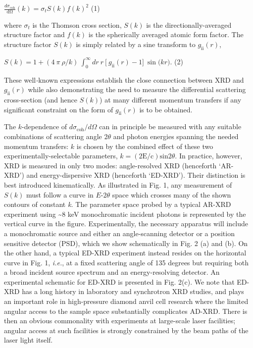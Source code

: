 \(\frac{d\sigma_{\text{coh}}}{\text{dΩ}}\left( k \right) = \sigma_{t}S\left( k \right){f\left( k \right)}^{2}\)
(1)

where \(\sigma_{t}\) is the Thomson cross section, \(S(k)\) is the
directionally-averaged structure factor and \(f\left( k \right)\) is the
spherically averaged atomic form factor. The structure factor \(S(k)\)
is simply related by a sine transform to
\(g_{\text{ii}}\left( r \right)\),

\(S\left( k \right) = 1 + (4\ \pi\ \rho/k)\ \int_{0}^{\infty}{dr\ r\ \lbrack\ g_{\text{ii}}\left( r \right) - 1\rbrack}\ \sin{(kr})\).
(2)

These well\emph{-}known expressions establish the close connection
between XRD and \(g_{\text{ii}}\left( r \right)\) while also
demonstrating the need to measure the differential scattering
cross-section (and hence \(S(k)\)) at many different momentum transfers
if any significant constraint on the form of
\(g_{\text{ii}}\left( r \right)\) is to be obtained.

The \(k\)-dependence of \(d\sigma_{\text{coh}}/d\Omega\) can in
principle be measured with any suitable combinations of scattering angle
\(2\theta\) and photon energies spanning the needed momentum transfers:
\(k\) is chosen by the combined effect of these two
experimentally-selectable parameters,
\(k = \operatorname{(2E/c)sin}{2\theta}\). In practice, however, XRD is
measured in only two modes: angle-resolved XRD (henceforth `AR-XRD') and
energy-dispersive XRD (henceforth `ED-XRD'). Their distinction is best
introduced kinematically. As illustrated in Fig. 1, any measurement of
\(S(k)\) must follow a curve in \(E\)-\(2\theta\) space which crosses
many of the shown contours of constant \emph{k.} The parameter space
probed by a typical AR-XRD experiment using \textasciitilde{}8 keV
monochromatic incident photons is represented by the vertical curve in
the figure. Experimentally, the necessary apparatus will include a
monochromatic source and either an angle-scanning detector or a position
sensitive detector (PSD), which we show schematically in Fig. 2 (a) and
(b). On the other hand, a typical ED-XRD experiment instead resides on
the horizontal curve in Fig. 1, \emph{i.e.}, at a fixed scattering angle
of 135 degrees but requiring both a broad incident source spectrum and
an energy-resolving detector. An experimental schematic for ED-XRD is
presented in Fig. 2(c). We note that ED-XRD has a long history in
laboratory and synchrotron XRD studies, and plays an important role in
high-pressure diamond anvil cell research where the limited angular
access to the sample space substantially complicates
AD-XRD.\hyperref[y.-feng-m.-somayazulu-r.-jaramillo-t.-rosenbaum-e.-isaacs-j.-hu-and-h.-k.-mao-review-of-scientific-instruments-76-063913-2005.]\cite{FENG2005ENERGY, HOIDN2014PHOTOMETRIC, FENG2007PRESSURE, DESGRENIERS1989TIN, BAUBLITZ1981ENERGY}
There is then an obvious commonality with experiments at large-scale
laser facilities; angular access at such facilities is strongly
constrained by the beam paths of the laser light itself.

